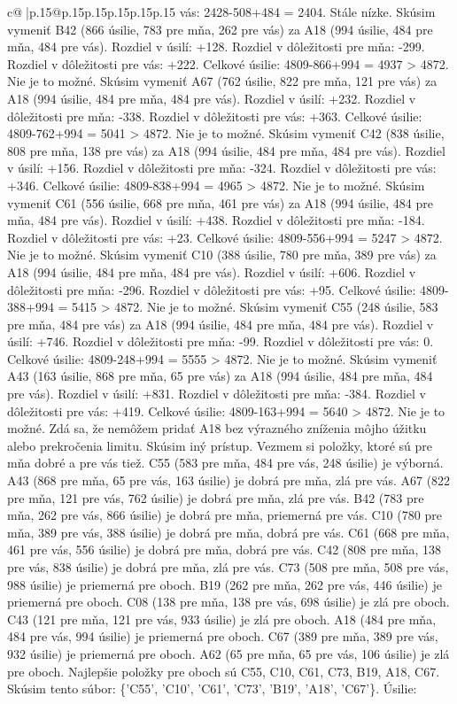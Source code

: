 \documentclass{article}
\begin{document}
{\begin{supertabular}{c@{$\;$}|p{.15\linewidth}@{}p{.15\linewidth}p{.15\linewidth}p{.15\linewidth}p{.15\linewidth}p{.15\linewidth}}
{{{vás: 2428{-}508+484 = 2404. Stále nízke. Skúsim vymeniť B42 (866 úsilie, 783 pre mňa, 262 pre vás) za A18 (994 úsilie, 484 pre mňa, 484 pre vás). Rozdiel v úsilí: +128. Rozdiel v dôležitosti pre mňa: {-}299. Rozdiel v dôležitosti pre vás: +222. Celkové úsilie: 4809{-}866+994 = 4937 > 4872. Nie je to možné. Skúsim vymeniť A67 (762 úsilie, 822 pre mňa, 121 pre vás) za A18 (994 úsilie, 484 pre mňa, 484 pre vás). Rozdiel v úsilí: +232. Rozdiel v dôležitosti pre mňa: {-}338. Rozdiel v dôležitosti pre vás: +363. Celkové úsilie: 4809{-}762+994 = 5041 > 4872. Nie je to možné. Skúsim vymeniť C42 (838 úsilie, 808 pre mňa, 138 pre vás) za A18 (994 úsilie, 484 pre mňa, 484 pre vás). Rozdiel v úsilí: +156. Rozdiel v dôležitosti pre mňa: {-}324. Rozdiel v dôležitosti pre vás: +346. Celkové úsilie: 4809{-}838+994 = 4965 > 4872. Nie je to možné. Skúsim vymeniť C61 (556 úsilie, 668 pre mňa, 461 pre vás) za A18 (994 úsilie, 484 pre mňa, 484 pre vás). Rozdiel v úsilí: +438. Rozdiel v dôležitosti pre mňa: {-}184. Rozdiel v dôležitosti pre vás: +23. Celkové úsilie: 4809{-}556+994 = 5247 > 4872. Nie je to možné. Skúsim vymeniť C10 (388 úsilie, 780 pre mňa, 389 pre vás) za A18 (994 úsilie, 484 pre mňa, 484 pre vás). Rozdiel v úsilí: +606. Rozdiel v dôležitosti pre mňa: {-}296. Rozdiel v dôležitosti pre vás: +95. Celkové úsilie: 4809{-}388+994 = 5415 > 4872. Nie je to možné. Skúsim vymeniť C55 (248 úsilie, 583 pre mňa, 484 pre vás) za A18 (994 úsilie, 484 pre mňa, 484 pre vás). Rozdiel v úsilí: +746. Rozdiel v dôležitosti pre mňa: {-}99. Rozdiel v dôležitosti pre vás: 0. Celkové úsilie: 4809{-}248+994 = 5555 > 4872. Nie je to možné. Skúsim vymeniť A43 (163 úsilie, 868 pre mňa, 65 pre vás) za A18 (994 úsilie, 484 pre mňa, 484 pre vás). Rozdiel v úsilí: +831. Rozdiel v dôležitosti pre mňa: {-}384. Rozdiel v dôležitosti pre vás: +419. Celkové úsilie: 4809{-}163+994 = 5640 > 4872. Nie je to možné. Zdá sa, že nemôžem pridať A18 bez výrazného zníženia môjho úžitku alebo prekročenia limitu. Skúsim iný prístup. Vezmem si položky, ktoré sú pre mňa dobré a pre vás tiež. C55 (583 pre mňa, 484 pre vás, 248 úsilie) je výborná. A43 (868 pre mňa, 65 pre vás, 163 úsilie) je dobrá pre mňa, zlá pre vás. A67 (822 pre mňa, 121 pre vás, 762 úsilie) je dobrá pre mňa, zlá pre vás. B42 (783 pre mňa, 262 pre vás, 866 úsilie) je dobrá pre mňa, priemerná pre vás. C10 (780 pre mňa, 389 pre vás, 388 úsilie) je dobrá pre mňa, dobrá pre vás. C61 (668 pre mňa, 461 pre vás, 556 úsilie) je dobrá pre mňa, dobrá pre vás. C42 (808 pre mňa, 138 pre vás, 838 úsilie) je dobrá pre mňa, zlá pre vás. C73 (508 pre mňa, 508 pre vás, 988 úsilie) je priemerná pre oboch. B19 (262 pre mňa, 262 pre vás, 446 úsilie) je priemerná pre oboch. C08 (138 pre mňa, 138 pre vás, 698 úsilie) je zlá pre oboch. C43 (121 pre mňa, 121 pre vás, 933 úsilie) je zlá pre oboch. A18 (484 pre mňa, 484 pre vás, 994 úsilie) je priemerná pre oboch. C67 (389 pre mňa, 389 pre vás, 932 úsilie) je priemerná pre oboch. A62 (65 pre mňa, 65 pre vás, 106 úsilie) je zlá pre oboch. Najlepšie položky pre oboch sú C55, C10, C61, C73, B19, A18, C67. Skúsim tento súbor: \{'C55', 'C10', 'C61', 'C73', 'B19', 'A18', 'C67'\}. Úsilie: }}}
\end{supertabular}}
\end{document}
